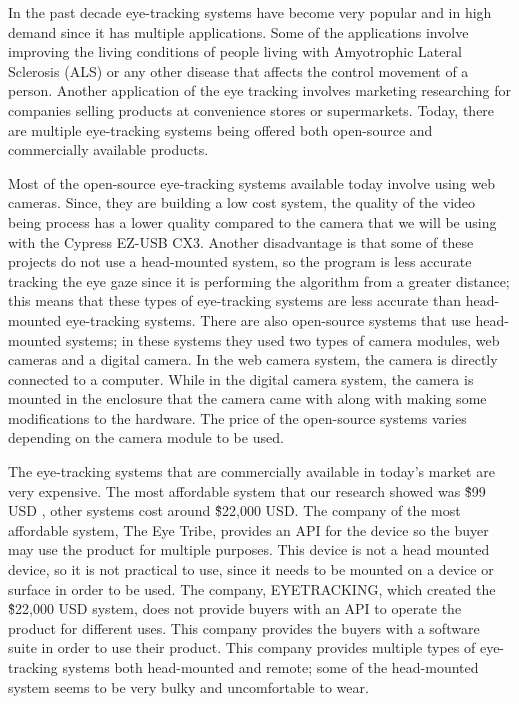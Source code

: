 In the past decade eye-tracking systems have become very popular and in high demand since it has multiple applications. Some of the applications involve improving the living conditions of people living with Amyotrophic Lateral Sclerosis (ALS) or any other disease that affects the control movement of a person. Another application of the eye tracking involves marketing researching for companies selling products at convenience stores or supermarkets. Today, there are multiple eye-tracking systems being offered both open-source and commercially available products.

Most of the open-source eye-tracking systems available today involve using web cameras. Since, they are building a low cost system, the quality of the video being process has a lower quality compared to the camera that we will be using with the Cypress EZ-USB CX3. Another disadvantage is that some of these projects do not use a head-mounted system, so the program is less accurate tracking the eye gaze since it is performing the algorithm from a greater distance; this means that these types of eye-tracking systems are less accurate than head-mounted eye-tracking systems. There are also open-source systems that use head-mounted systems; in these systems they used two types of camera modules, web cameras and a digital camera. In the web camera system, the camera is directly connected to a computer. \cite{Kumar2006} While in the digital camera system, the camera is mounted in the enclosure that the camera came with along with making some modifications to the hardware. \cite{Unknown2015} The price of the open-source systems varies depending on the camera module to be used. 

The eye-tracking systems that are commercially available in today’s market are very expensive. The most affordable system that our research showed was \"\$99 USD\" \cite{TheEyeTribe2015} , other systems cost around \"\$22,000 USD.\" \cite{EyeTracking2011} The company of the most affordable system, The Eye Tribe, provides an API for the device so the buyer may use the product for multiple purposes. This device is not a head mounted device, so it is not practical to use, since it needs to be mounted on a device or surface in order to be used. The company, EYETRACKING, which created the \"\$22,000 USD\" \cite{EyeTracking2011} system, does not provide buyers with an API to operate the product for different uses. This company provides the buyers with a software suite in order to use their product. This company provides multiple types of eye-tracking systems both head-mounted and remote; some of the head-mounted system seems to be very bulky and uncomfortable to wear.